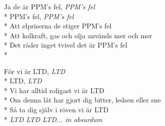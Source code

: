 \begin{SongText}
\begin{SongVerse}
        Ja de är PPM's fel, \textit{PPM's fel}\\*%
        PPM's fel, \textit{PPM's fel}\\*%
        Att elpriserna de stiger PPM's fel\\*%
        Att kolkraft, gas och olja används mer och mer\\*%
        Det råder inget tvivel det är PPM's fel\\*%
    \end{SongVerse}
    \begin{SongVerse}
        För vi är LTD, \textit{LTD}\\*%
        LTD, \textit{LTD}\\*%
        Vi har alltid roligast vi är LTD\\*%
        Om denna låt har gjort dig bitter, ledsen eller sne\\*%
        Så ta dig själv i röven vi är LTD\\*%
        \textit{LTD LTD LTD... in absurdum}
    \end{SongVerse}
\end{SongText}
